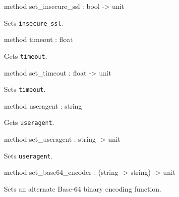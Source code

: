 \documentclass[11pt]{article}
\begin{document}
\begin{ocamldocobjectend}
\begin{ocamldocdescription}
\end{ocamldocdescription}


\label{method:XmlRpc.client.set-underscoreinsecure-underscoressl}\begin{ocamldoccode}
method set_insecure_ssl : bool -> unit
\end{ocamldoccode}
\begin{ocamldocdescription}
Sets {\tt{insecure\_ssl}}.


\end{ocamldocdescription}


\label{method:XmlRpc.client.timeout}\begin{ocamldoccode}
method timeout : float
\end{ocamldoccode}
\begin{ocamldocdescription}
Gets {\tt{timeout}}.


\end{ocamldocdescription}


\label{method:XmlRpc.client.set-underscoretimeout}\begin{ocamldoccode}
method set_timeout : float -> unit
\end{ocamldoccode}
\begin{ocamldocdescription}
Sets {\tt{timeout}}.


\end{ocamldocdescription}


\label{method:XmlRpc.client.useragent}\begin{ocamldoccode}
method useragent : string
\end{ocamldoccode}
\begin{ocamldocdescription}
Gets {\tt{useragent}}.


\end{ocamldocdescription}


\label{method:XmlRpc.client.set-underscoreuseragent}\begin{ocamldoccode}
method set_useragent : string -> unit
\end{ocamldoccode}
\begin{ocamldocdescription}
Sets {\tt{useragent}}.


\end{ocamldocdescription}


\label{method:XmlRpc.client.set-underscorebase64-underscoreencoder}\begin{ocamldoccode}
method set_base64_encoder : (string -> string) -> unit
\end{ocamldoccode}
\begin{ocamldocdescription}
Sets an alternate Base-64 binary encoding function.



\end{ocamldocdescription}
\end{ocamldocobjectend}
\end{document}
